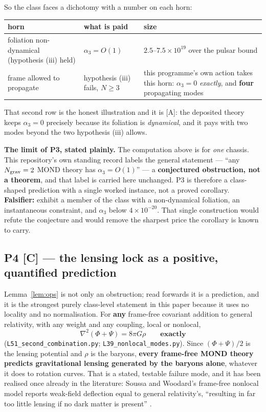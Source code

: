 \documentclass[11pt,letterpaper]{article}
\begin{document}
So the class faces a dichotomy with a number on each horn:
\begin{center}\small
\begin{tabular}{L{0.30\textwidth}L{0.30\textwidth}L{0.32\textwidth}}\toprule
horn & what is paid & size\\\midrule
foliation non-dynamical (hypothesis (iii) held) & $\alpha_3=O(1)$ & $2.5$--$7.5\times10^{19}$ over the pulsar bound\\
frame allowed to propagate & hypothesis (iii) fails, $N\ge3$ & this programme's own action \cite{Zimmerman2026paper8} takes this horn: $\alpha_3=0$ \emph{exactly}, and \textbf{four} propagating modes\\\bottomrule
\end{tabular}
\end{center}
That second row is the honest illustration and it is [A]: the deposited theory keeps $\alpha_3=0$ precisely because its foliation is \emph{dynamical}, and it pays with two modes beyond the two hypothesis (iii) allows.

\textbf{The limit of P3, stated plainly.} The computation above is for \emph{one} chassis. This repository's own standing record labels the general statement --- ``any $N_{\rm grav}=2$ MOND theory has $\alpha_3=O(1)$'' --- a \textbf{conjectured obstruction, not a theorem}, and that label is carried here unchanged. P3 is therefore a class-shaped prediction with a single worked instance, not a proved corollary. \textbf{Falsifier:} exhibit a member of the class with a non-dynamical foliation, an instantaneous constraint, and $\alpha_3$ below $4\times10^{-20}$. That single construction would refute the conjecture and would remove the sharpest price the corollary is known to carry.

\subsection{P4 [C] --- the lensing lock as a positive, quantified prediction}

Lemma~\ref{lem:ops} is not only an obstruction; read forwards it is a prediction, and it is the strongest purely class-level statement in this paper because it uses no locality and no normalisation. For \textbf{any} frame-free covariant addition to general relativity, with any weight and any coupling, local or nonlocal,
\begin{equation}
\nabla^2(\Phi+\Psi)=8\pi G\rho\qquad\textbf{exactly}
\end{equation}
(\texttt{L51\_second\_combination.py}; \texttt{L39\_nonlocal\_modes.py}). Since $(\Phi+\Psi)/2$ is the lensing potential and $\rho$ is the baryons, \textbf{every frame-free MOND theory predicts gravitational lensing generated by the baryons alone}, whatever it does to rotation curves. That is a stated, testable failure mode, and it has been realised once already in the literature: Soussa and Woodard's frame-free nonlocal model reports weak-field deflection equal to general relativity's, ``resulting in far too little lensing if no dark matter is present'' \cite{SoussaWoodard2003}.
\end{document}
